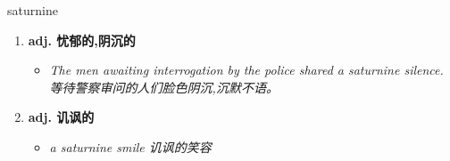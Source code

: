 
\begin{frame}
{\huge saturnine}
\begin{center}
\begin{enumerate}\Large
  \item \textbf{adj. 忧郁的,阴沉的}
  \begin{itemize}
    \item \em{\Large{The men awaiting interrogation by the police shared a saturnine silence. 等待警察审问的人们脸色阴沉,沉默不语。}}
  \end{itemize}
  \item \textbf{adj. 讥讽的}
  \begin{itemize}
    \item \em{\Large{a saturnine smile 讥讽的笑容}}
  \end{itemize}
\end{enumerate}
\end{center}
\end{frame}
